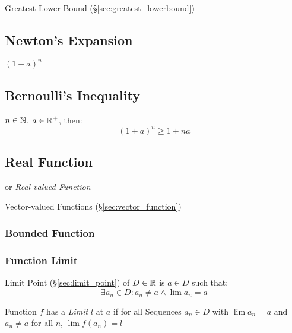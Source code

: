 Greatest Lower Bound (\S\ref{sec:greatest_lowerbound})



\subsection{Newton's Expansion}\label{sec:newtons_expansion}


$(1 + a)^n$ %



\subsection{Bernoulli's Inequality}\label{sec:bernoullis_inequality}

$n \in \mathbb{N}$, $a \in \mathbb{R}^+$, then:
\[
  (1 + a)^n \geq 1 + n a
\]


\subsection{Real Function}\label{sec:real_function}

or \emph{Real-valued Function}

\fist Vector-valued Functions (\S\ref{sec:vector_function})



\subsubsection{Bounded Function}\label{sec:bounded_function}

\subsubsection{Function Limit}\label{sec:function_limit}

Limit Point (\S\ref{sec:limit_point}) of $D \in \mathbb{R}$ is $a \in D$
such that:
\[
  \exists a_n \in D : a_n \neq a \wedge \lim a_n = a
\]

Function $f$ has a \emph{Limit} $l$ at $a$ if for all Sequences $a_n
\in D$ with $\lim a_n = a$ and $a_n \neq a$ for all $n$, $\lim f(a_n)
= l$



